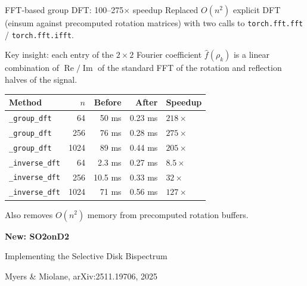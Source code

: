 \documentclass[aspectratio=169]{beamer}
\begin{document}
\begin{frame}{FFT-based group DFT: 100--275$\times$ speedup}
  Replaced $O(n^2)$ explicit DFT (einsum against precomputed rotation matrices)
  with two calls to \texttt{torch.fft.fft} / \texttt{torch.fft.ifft}.

  \bigskip

  Key insight: each entry of the $2\times 2$ Fourier coefficient $\hat{f}(\rho_k)$
  is a linear combination of $\operatorname{Re}/\operatorname{Im}$ of the standard FFT
  of the rotation and reflection halves of the signal.

  \bigskip

  \begin{table}
    \scriptsize
    \begin{tabular}{lrrrl}
      \toprule
      \textbf{Method} & $n$ & \textbf{Before} & \textbf{After} & \textbf{Speedup} \\
      \midrule
      \texttt{\_group\_dft}   &   64 & 50 ms   & 0.23 ms & $218\times$ \\
      \texttt{\_group\_dft}   &  256 & 76 ms   & 0.28 ms & $275\times$ \\
      \texttt{\_group\_dft}   & 1024 & 89 ms   & 0.44 ms & $205\times$ \\
      \texttt{\_inverse\_dft} &   64 & 2.3 ms  & 0.27 ms & $8.5\times$ \\
      \texttt{\_inverse\_dft} &  256 & 10.5 ms & 0.33 ms & $32\times$ \\
      \texttt{\_inverse\_dft} & 1024 & 71 ms   & 0.56 ms & $127\times$ \\
      \bottomrule
    \end{tabular}
  \end{table}

  Also removes $O(n^2)$ memory from precomputed rotation buffers.
\end{frame}


\begin{frame}{}
  \vfill
  \centering
  {\Large\textbf{New: SO2onD2}}

  \medskip

  {\normalsize Implementing the Selective Disk Bispectrum}

  \smallskip

  {\small Myers \& Miolane, arXiv:2511.19706, 2025}
  \vfill
\end{frame}
\end{document}

